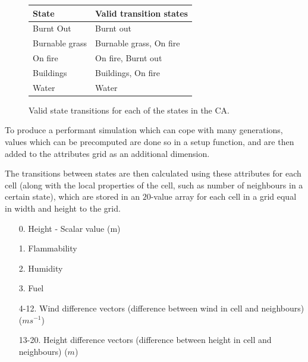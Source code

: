 \documentclass[11pt, a4paper, titlepage]{article}
\begin{document}
\begin{figure}[h]
  \centering
    \begin{tabular}{ || l | l ||}
      \hline
      \textbf{State}            &  \textbf{Valid transition states}  \\ 
      \hline
      Burnt Out        &  Burnt out           \\       
      Burnable grass         &  Burnable grass, On fire   \\
      On fire          &  On fire, Burnt out  \\   
      Buildings          &  Buildings, On fire  \\   
      Water     &  Water        \\
      \hline
 
    \end{tabular}
  \caption{Valid state transitions for each of the states in the CA.}
  \label{Valid state transitions}
\end{figure}

To produce a performant simulation which can cope with many generations, values which can be precomputed are done so in a setup function, and are then added to the attributes grid as an additional dimension.

The transitions between states are then calculated using these attributes for each cell (along with the local properties of the cell, such as number of neighbours in a certain state), which are stored in an $20$-value array for each cell in a grid equal in width and height to the grid. 

\begin{itemize}
  \item [0.] Height - Scalar value (m)
  \item [1.] Flammability
  \item [2.] Humidity
  \item [3.] Fuel
  \item [4-12.] Wind difference vectors (difference between wind in cell and neighbours) ($ms^{-1}$)
  \item [13-20.] Height difference vectors (difference between height in cell and neighbours) ($m$)
\end{itemize}
\end{document}
